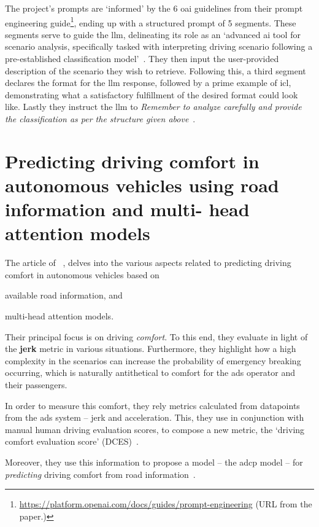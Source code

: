 The project's prompts are `informed' by the \num{6} \acrlong{oai} guidelines from their prompt
engineering guide\footnote{\url{https://platform.openai.com/docs/guides/prompt-engineering} (URL
    from the paper.)}, ending up with a structured prompt of \num{5} segments. These segments serve to
guide the \acrshort{llm}, delineating its role as an `advanced \acrshort{ai} tool for scenario
analysis, specifically tasked with interpreting driving scenario following a pre-established
classification model'~\cite[562]{chat2Scenario}. They then input the user-provided description of
the scenario they wish to retrieve. Following this, a third segment declares the format for the
\acrshort{llm} response, followed by a prime example of \acrlong{icl}, demonstrating what a
satisfactory fulfillment of the desired format could look like. Lastly they instruct the
\acrshort{llm} to \textit{Remember to analyze carefully and provide the classification as per the
    structure given above}~\cite[563]{chat2Scenario}.

\section{Predicting driving comfort in autonomous vehicles using road information and multi- head
  attention models}

The \citeyear{Chen2025} article of \citeauthor{Chen2025}~\cite{Chen2025}, delves into the various
aspects related to predicting driving comfort in autonomous vehicles based on \begin{inparaenum}
    \item available road information, and
    \item multi-head attention models.
\end{inparaenum}
Their principal focus is on driving \emph{comfort}. To this end, they evaluate  in
light of the \textbf{jerk} metric in various situations. Furthermore, they highlight how a high
complexity in the scenarios can increase the probability of emergency breaking occurring, which is
naturally antithetical to comfort for the \acrshort{ads} operator and their passengers.

In order to measure this comfort, they rely metrics calculated from datapoints from the
\acrshort{ads} system -- jerk and acceleration. This, they use in conjunction with manual human
driving evaluation scores, to compose a new metric, the `driving comfort evaluation score'
(DCES)~\cite[10]{Chen2025}.

Moreover, they use this information to propose a model -- the \acrfull{adcp} model -- for
\emph{predicting} driving comfort from road information~\cite[2]{Chen2025}.